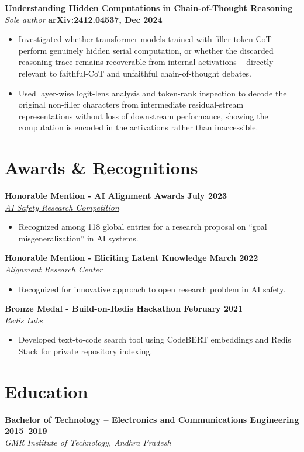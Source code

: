 \documentclass[11pt,a4paper]{article}
\newcommand{\entrygap}{\vspace{8pt}}
\begin{document}
\entrygap
\textbf{\href{https://arxiv.org/abs/2412.04537}{Understanding Hidden Computations in Chain-of-Thought Reasoning}} \\
\textit{Sole author} \hfill \textbf{arXiv:2412.04537, Dec 2024}
\begin{itemize}[leftmargin=*, nosep]
\item Investigated whether transformer models trained with filler-token CoT perform genuinely hidden serial computation, or whether the discarded reasoning trace remains recoverable from internal activations -- directly relevant to faithful-CoT and unfaithful chain-of-thought debates.
\item Used layer-wise logit-lens analysis and token-rank inspection to decode the original non-filler characters from intermediate residual-stream representations without loss of downstream performance, showing the computation is encoded in the activations rather than inaccessible.
\end{itemize}


\section{Awards \& Recognitions}

\textbf{Honorable Mention - AI Alignment Awards} \hfill \textbf{July 2023} \\
\textit{\href{https://www.lesswrong.com/posts/zFoAAD7dfWdczxoLH/winners-of-ai-alignment-awards-research-contest}{AI Safety Research Competition}}
\begin{itemize}[leftmargin=*, nosep]
\item Recognized among 118 global entries for a research proposal on ``goal misgeneralization'' in AI systems.
\end{itemize}

\entrygap
\textbf{Honorable Mention - Eliciting Latent Knowledge} \hfill \textbf{March 2022} \\
\textit{Alignment Research Center}
\begin{itemize}[leftmargin=*, nosep]
\item Recognized for innovative approach to open research problem in AI safety.
\end{itemize}

\entrygap
\textbf{Bronze Medal - Build-on-Redis Hackathon} \hfill \textbf{February 2021} \\
\textit{Redis Labs}
\begin{itemize}[leftmargin=*, nosep]
\item Developed text-to-code search tool using CodeBERT embeddings and Redis Stack for private repository indexing.
\end{itemize}

\section{Education}

\textbf{Bachelor of Technology -- Electronics and Communications Engineering} \hfill \textbf{2015--2019} \\
\textit{GMR Institute of Technology, Andhra Pradesh}
\end{document}
